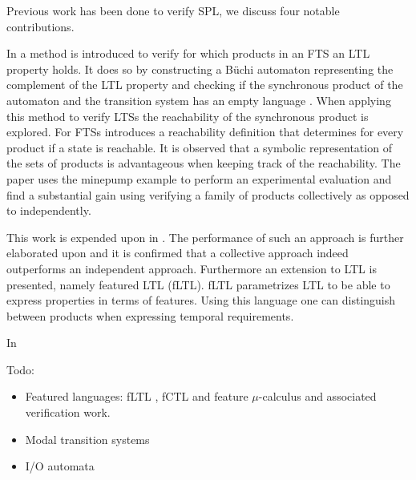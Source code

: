 Previous work has been done to verify SPL, we discuss four notable contributions.

In \cite{CheckingLotsOfSystems} a method is introduced to verify for which products in an FTS an LTL property holds. It does so by constructing a B{\"u}chi automaton representing the complement of the LTL property and checking if the synchronous product of the automaton and the transition system has an empty language \cite{LTLusingAutomata}. When applying this method to verify LTSs the reachability of the synchronous product is explored. For FTSs \cite{CheckingLotsOfSystems} introduces a reachability definition that determines for every product if a state is reachable. It is observed that a symbolic representation of the sets of products is advantageous when keeping track of the reachability. The paper uses the minepump \cite{Kramer1983CONICAI} example to perform an experimental evaluation and find a substantial gain using verifying a family of products collectively as opposed to independently.

This work is expended upon in \cite{FTSLTL}. The performance of such an approach is further elaborated upon and it is confirmed that a collective approach indeed outperforms an independent approach. Furthermore an extension to LTL is presented, namely featured LTL (fLTL). fLTL parametrizes LTL to be able to express properties in terms of features. Using this language one can distinguish between products when expressing temporal requirements.

In \cite{FTSCTL} 

Todo:
\begin{itemize}
	\item Featured languages: fLTL \cite{FTSLTL}, fCTL \cite{FTSCTL} and feature $\mu$-calculus \cite{FTSMu} and associated verification work.
	\item Modal transition systems
	\item I/O automata
\end{itemize}